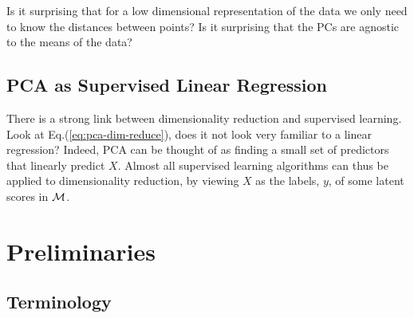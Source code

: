 \documentclass[12pt,a4paper]{article}
\begin{document}
\begin{think}
	Is it surprising that for a low dimensional representation of the data we only need to know the distances between points?
	Is it surprising that the PCs are agnostic to the means of the data?
\end{think}




\subsection{PCA as Supervised Linear Regression}
\label{sec:pca-as-supervised}
There is a strong link between dimensionality reduction and supervised learning.
Look at Eq.(\ref{eq:pca-dim-reduce}), does it not look very familiar to a linear regression?
Indeed, PCA can be thought of as finding a small set of predictors that linearly predict $X$. 
Almost all supervised learning algorithms can thus be applied to dimensionality reduction, by viewing $X$ as the labels, $y$, of some latent scores in $\mathcal{M}$.








\section{Preliminaries}

\subsection{Terminology}
\end{document}
